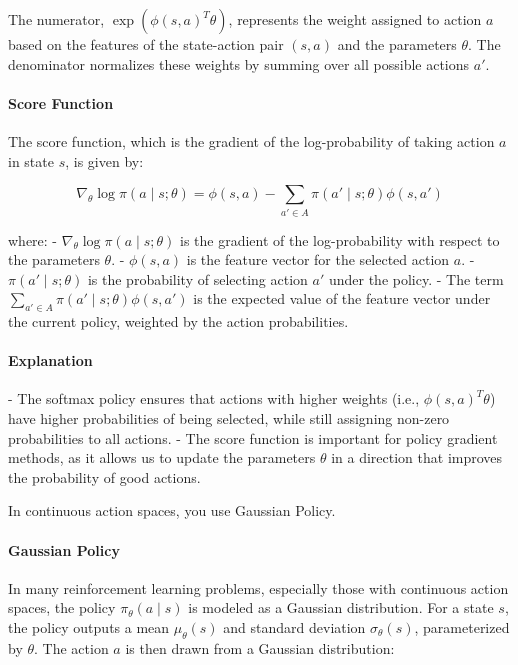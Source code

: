 \documentclass[10pt, oneside]{article}
\theoremstyle{definition}
\begin{document}
The numerator, $\exp(\phi(s, a)^T \theta)$, represents the weight assigned to action $a$ based on the features of the state-action pair $(s, a)$ and the parameters $\theta$. The denominator normalizes these weights by summing over all possible actions $a'$.

\paragraph{Score Function}

The score function, which is the gradient of the log-probability of taking action $a$ in state $s$, is given by:

\[
\nabla_\theta \log \pi(a \mid s; \theta) = \phi(s, a) - \sum_{a' \in A} \pi(a' \mid s; \theta) \phi(s, a')
\]

where:
- $\nabla_\theta \log \pi(a \mid s; \theta)$ is the gradient of the log-probability with respect to the parameters $\theta$.
- $\phi(s, a)$ is the feature vector for the selected action $a$.
- $\pi(a' \mid s; \theta)$ is the probability of selecting action $a'$ under the policy.
- The term $\sum_{a' \in A} \pi(a' \mid s; \theta) \phi(s, a')$ is the expected value of the feature vector under the current policy, weighted by the action probabilities.

\paragraph{Explanation}
- The softmax policy ensures that actions with higher weights (i.e., $\phi(s, a)^T \theta$) have higher probabilities of being selected, while still assigning non-zero probabilities to all actions.
- The score function is important for policy gradient methods, as it allows us to update the parameters $\theta$ in a direction that improves the probability of good actions.

In continuous action spaces, you use Gaussian Policy. 

\paragraph{Gaussian Policy}

In many reinforcement learning problems, especially those with continuous action spaces, the policy $\pi_\theta(a \mid s)$ is modeled as a Gaussian distribution. For a state $s$, the policy outputs a mean $\mu_\theta(s)$ and standard deviation $\sigma_\theta(s)$, parameterized by $\theta$. The action $a$ is then drawn from a Gaussian distribution:
\end{document}
